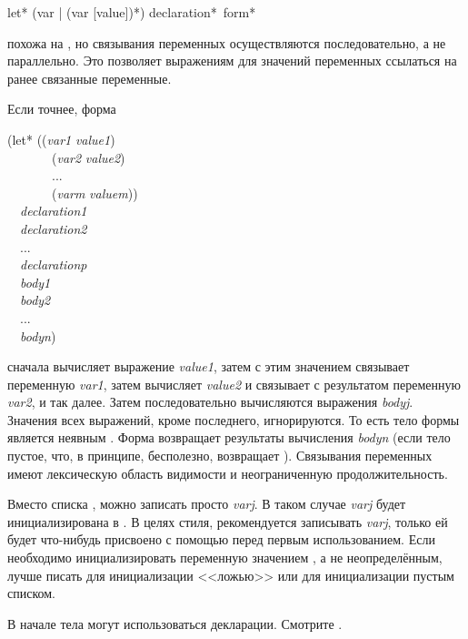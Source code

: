 \begin{defspec}
let* ({var | (var [value])}*) {declaration}* {\,form}*

 похожа на , но связывания переменных осуществляются
последовательно, а не параллельно. Это позволяет выражениям для значений
переменных ссылаться на ранее связанные переменные.

Если точнее, форма
\begin{lisp}
(let* ((\emph{var1} \emph{value1}) \\
~~~~~~~(\emph{var2} \emph{value2}) \\
~~~~~~~... \\
~~~~~~~(\emph{varm} \emph{valuem})) \\
~~\emph{declaration1} \\
~~\emph{declaration2} \\
~~... \\
~~\emph{declarationp} \\
~~\emph{body1} \\
~~\emph{body2} \\
~~... \\
~~\emph{bodyn})
\end{lisp}
сначала вычисляет выражение \emph{value1}, затем с этим значением связывает
переменную \emph{var1}, затем вычисляет \emph{value2} и связывает с 
результатом переменную \emph{var2}, и так далее.
Затем последовательно вычисляются выражения \emph{bodyj}.
Значения всех выражений, кроме последнего, игнорируются. То есть тело формы
 является неявным .
Форма  возвращает результаты вычисления \emph{bodyn} (если тело
пустое, что, в принципе, бесполезно,  возвращает {\false}).
Связывания переменных имеют лексическую область видимости и неограниченную продолжительность.

Вместо списка , можно записать просто
\emph{varj}.
В таком случае \emph{varj} будет инициализирована в {\false}. В целях стиля,
рекомендуется записывать \emph{varj}, только ей будет что-нибудь присвоено с
помощью  перед первым использованием.
Если необходимо инициализировать переменную значением {\nil}, а не
неопределённым, лучше писать  для инициализации
<<ложью>> или  для инициализации пустым
списком.

В начале тела  могут использоваться декларации. Смотрите .
\end{defspec}

